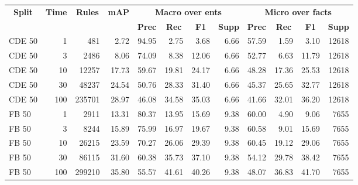 \begin{tabular}{| l | r | r | r | r | r | r | r | r | r | r | r |}
    \hline
    
    \multicolumn{1}{|c|}{\textbf{Split}} &
    \multicolumn{1}{|c|}{\textbf{Time}} &
    \multicolumn{1}{|c|}{\textbf{Rules}} &
    \multicolumn{1}{|c|}{\textbf{mAP}} &
    \multicolumn{4}{|c|}{\textbf{Macro over ents}} &
    \multicolumn{4}{|c|}{\textbf{Micro over facts}} \\
    
    \multicolumn{1}{|c|}{} &
    \multicolumn{1}{|c|}{} &
    \multicolumn{1}{|c|}{} &
    \multicolumn{1}{|c|}{} &
    \multicolumn{1}{|c|}{\textbf{Prec}} &
    \multicolumn{1}{|c|}{\textbf{Rec}} &
    \multicolumn{1}{|c|}{\textbf{F1}} &
    \multicolumn{1}{|c|}{\textbf{Supp}} &
    \multicolumn{1}{|c|}{\textbf{Prec}} &
    \multicolumn{1}{|c|}{\textbf{Rec}} &
    \multicolumn{1}{|c|}{\textbf{F1}} &
    \multicolumn{1}{|c|}{\textbf{Supp}} \\
    
    \hline \hline
    
    CDE 50 & \num{1} & \num{481} & 2.72 &
    94.95 & 2.75 & 3.68 & \num{6.66} &
    57.59 & 1.59 & 3.10 & \num{12618} \\
    
    CDE 50 & \num{3} & \num{2486} & 8.06 &
    74.09 & 8.38 & 12.06 & \num{6.66} &
    52.77 & 6.63 & 11.79 & \num{12618} \\
    
    CDE 50 & \num{10} & \num{12257} & 17.73 &
    59.67 & 19.81 & 24.17 & \num{6.66} &
    48.28 & 17.36 & 25.53 & \num{12618} \\
    
    CDE 50 & \num{30} & \num{48237} & 24.54 &
    50.76 & 28.33 & 31.40 & \num{6.66} &
    45.37 & 25.65 & 32.77 & \num{12618} \\
    
    CDE 50 & \num{100} & \num{235701} & 28.97 &
    46.08 & 34.58 & 35.03 & \num{6.66} &
    41.66 & 32.01 & 36.20 & \num{12618} \\
    
    \hline
    
    FB 50 & \num{1} & \num{2911} & 13.31 &
    80.37 & 13.95 & 15.69 & \num{9.38} &
    60.00 & 4.90 & 9.06 & \num{7655} \\
    
    FB 50 & \num{3} & \num{8244} & 15.89 &
    75.99 & 16.97 & 19.67 & \num{9.38} &
    60.58 & 9.01 & 15.69 & \num{7655} \\
    
    FB 50 & \num{10} & \num{26215} & 23.59 &
    70.27 & 26.06 & 29.39 & \num{9.38} &
    60.45 & 19.12 & 29.06 & \num{7655} \\
    
    FB 50 & \num{30} & \num{86115} & 31.60 &
    60.38 & 35.73 & 37.10 & \num{9.38} &
    54.12 & 29.78 & 38.42 & \num{7655} \\
    
    FB 50 & \num{100} & \num{299210} & 35.80 &
    55.57 & 41.61 & 40.26 & \num{9.38} &
    48.07 & 36.83 & 41.70 & \num{7655} \\
    
    \hline
\end{tabular}
